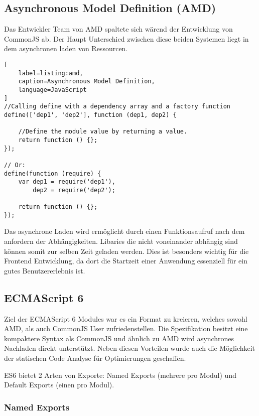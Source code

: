 \subsection{Asynchronous Model Definition (AMD)}

Das Entwickler Team von AMD spaltete sich wärend der Entwicklung von CommonJS ab. Der Haupt Unterschied zwischen diese beiden Systemen liegt in dem asynchronen laden von Ressourcen. \autocite{SebastianPeyrott}

\begin{lstlisting}[
    label=listing:amd,
	caption=Asynchronous Model Definition,
	language=JavaScript
]
//Calling define with a dependency array and a factory function
define(['dep1', 'dep2'], function (dep1, dep2) {

    //Define the module value by returning a value.
    return function () {};
});

// Or:
define(function (require) {
    var dep1 = require('dep1'),
        dep2 = require('dep2');

    return function () {};
});
\end{lstlisting}

Das asynchrone Laden wird ermöglicht durch einen Funktionsaufruf nach dem anfordern der  Abhängigkeiten. Libaries die nicht voneinander abhängig sind können somit zur selben Zeit geladen werden. Dies ist besonders wichtig für die Frontend Entwicklung, da dort die Startzeit einer Anwendung essenziell für ein gutes Benutzererlebnis ist. \autocite{SebastianPeyrott}

\subsection{ECMAScript 6}
Ziel der ECMAScript 6 Modules war es ein Format zu kreieren, welches sowohl AMD, als auch CommonJS User zufriedenstellen. Die Spezifikation besitzt eine kompaktere Syntax als CommonJS und ähnlich zu AMD wird asynchrones Nachladen direkt unterstützt. Neben diesen Vorteilen wurde auch die Möglichkeit der statischen Code Analyse für Optimierungen geschaffen. 

ES6 bietet 2 Arten von Exporte: Named Exports (mehrere pro Modul) und Default Exports (einen pro Modul). \autocite{AxelRauschmayer2014}

\subsubsection{Named Exports}
\label{subsubsection:named_exports}

